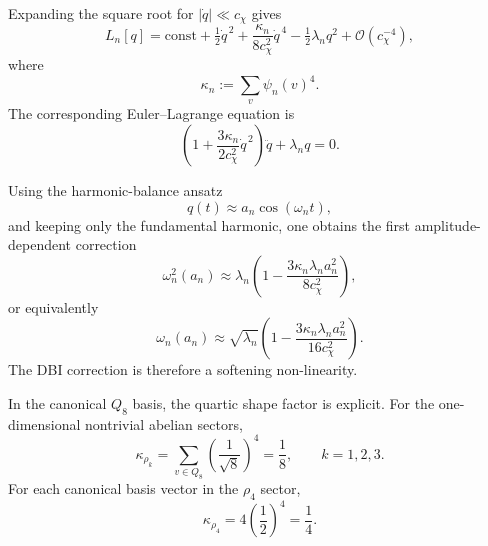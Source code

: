\documentclass[11pt,a4paper]{article}
\begin{document}
    Expanding the square root for $|\dot{q}| \ll c_\chi$ gives
    \begin{equation}
      \label{eq:mode-lagrangian-expansion}
      L_n[q]
      =
      \mathrm{const}
      + \tfrac{1}{2}\dot{q}^{\,2}
      + \frac{\kappa_n}{8c_\chi^2}\dot{q}^{\,4}
      - \tfrac{1}{2}\lambda_n q^2
      + \mathcal{O}(c_\chi^{-4}),
    \end{equation}
    where
    \begin{equation}
      \label{eq:kappa-def}
      \kappa_n := \sum_v \psi_n(v)^4.
    \end{equation}
    The corresponding Euler--Lagrange equation is
    \begin{equation}
      \label{eq:weakly-nonlinear-mode-equation}
      \left(
        1 + \frac{3\kappa_n}{2c_\chi^2}\dot{q}^{\,2}
      \right)\ddot{q}
      + \lambda_n q
      = 0.
    \end{equation}

    Using the harmonic-balance ansatz
    \begin{equation}
      q(t) \approx a_n \cos(\omega_n t),
    \end{equation}
    and keeping only the fundamental harmonic, one obtains the first
    amplitude-dependent correction
    \begin{equation}
      \label{eq:omega-shift-square}
      \omega_n^2(a_n)
      \approx
      \lambda_n
      \left(
        1 - \frac{3\kappa_n\lambda_n a_n^2}{8c_\chi^2}
      \right),
    \end{equation}
    or equivalently
    \begin{equation}
      \label{eq:omega-shift}
      \omega_n(a_n)
      \approx
      \sqrt{\lambda_n}
      \left(
        1 - \frac{3\kappa_n\lambda_n a_n^2}{16c_\chi^2}
      \right).
    \end{equation}
    The DBI correction is therefore a softening non-linearity.

    In the canonical $Q_8$ basis, the quartic shape factor is explicit.
    For the one-dimensional nontrivial abelian sectors,
    \begin{equation}
      \label{eq:kappa-abelian}
      \kappa_{\rho_k}
      =
      \sum_{v \in Q_8} \left(\frac{1}{\sqrt{8}}\right)^4
      =
      \frac{1}{8},
      \qquad
      k = 1,2,3.
    \end{equation}
    For each canonical basis vector in the $\rho_4$ sector,
    \begin{equation}
      \label{eq:kappa-nonabelian}
      \kappa_{\rho_4}
      =
      4 \left(\frac{1}{2}\right)^4
      =
      \frac{1}{4}.
    \end{equation}
\end{document}
